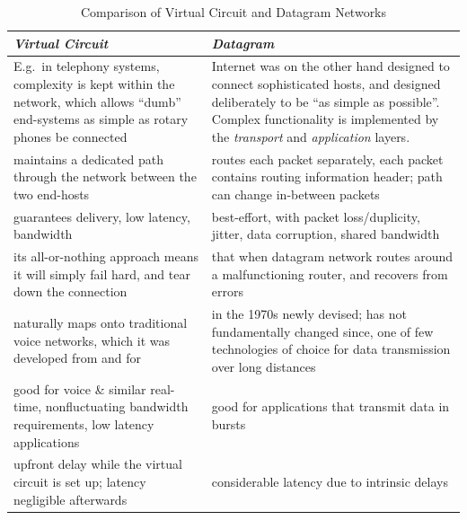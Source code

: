 \documentclass[10pt]{report}
\begin{document}
\begin{table}[h]
  \begin{tabular}{ | p{6cm} | p{6cm} | }
  \hline

  {\em Virtual Circuit}
  	& {\em Datagram} \\ \hline
  \hline

E.g.\ in telephony systems, complexity is kept within the network, which allows ``dumb'' end-systems as simple as rotary phones be connected \cite[p349]{kurose}
	& Internet was on the other hand designed to connect sophisticated
	hosts, and designed deliberately to be ``as simple as possible''.  Complex functionality is implemented by the {\em transport} and {\em application} layers. \cite[pp349--351]{kurose}
	\\ \hline

maintains a dedicated path through the network between the two end-hosts 
	& routes each packet separately, each packet contains routing
	information header; path can change in-between packets \\ \hline

guarantees delivery, low latency, bandwidth
	& best-effort, with packet loss/duplicity, jitter, data corruption,
	shared bandwidth \\ \hline

its all-or-nothing approach means it will simply fail hard, and tear down the
connection
	&  that when datagram network routes around a malfunctioning router,
	and recovers from errors \\ \hline

naturally maps onto traditional voice networks, which it was developed from and
for
	& in the 1970s newly devised; has not fundamentally changed since, one
	of few technologies of choice for data transmission over long distances
	\cite[p298--299]{stallings} \\ \hline

good for voice \& similar real-time, nonfluctuating bandwidth requirements, low
latency applications
	& good for applications that transmit data in bursts \\ \hline

upfront delay while the virtual circuit is set up; latency negligible afterwards
	& considerable latency due to intrinsic delays \\ \hline

  \end{tabular}
  \caption{Comparison of Virtual Circuit and Datagram Networks}
  \label{vcdgcomparison}

\end{table} 
\end{document}
